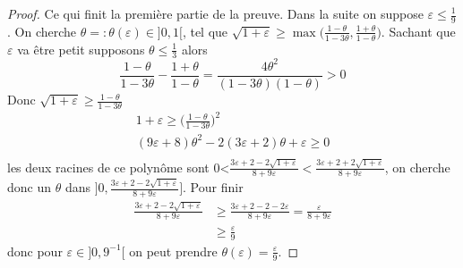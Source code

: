 \documentclass[12pt]{article}
\theoremstyle{definition}
\begin{document}
\begin{proof}
	Ce qui finit la première partie de la preuve. Dans la suite on suppose $\varepsilon\leq \frac{1}{9}$. On cherche $\theta=:\theta(\varepsilon)\in]0,1[$, tel que $\sqrt{1+\varepsilon}\geq \max\big(\frac{1-\theta}{1-3\theta},\frac{1+\theta}{1-\theta}\big)$. Sachant que $\varepsilon$ va être petit supposons $\theta\leq \frac{1}{3}$ alors
	\begin{equation*}
	\frac{1-\theta}{1-3\theta}-\frac{1+\theta}{1-\theta} = \frac{4\theta^2}{(1-3\theta) (1-\theta)}>0
	\end{equation*}
	Donc $\sqrt{1+\varepsilon}\geq \frac{1-\theta}{1-3\theta}$
	\begin{equation*}
	\begin{array}{ccc}
	1+\varepsilon \geq  \big(\frac{1-\theta}{1-3\theta}\big)^2\\
	(9\varepsilon+8)\theta^2 - 2(3\varepsilon+2)\theta +\varepsilon \geq 0\\
	\end{array}
	\end{equation*}
	les deux racines de ce polynôme sont 0<$\frac{3\varepsilon+2-2\sqrt{1+\varepsilon}}{8+9\varepsilon}<\frac{3\varepsilon+2+2\sqrt{1+\varepsilon}}{8+9\varepsilon}$, on cherche donc un $\theta$ dans $]0,\frac{3\varepsilon+2-2\sqrt{1+\varepsilon}}{8+9\varepsilon}]$. Pour finir 
	\begin{align*}
	\frac{3\varepsilon+2-2\sqrt{1+\varepsilon}}{8+9\varepsilon}&\geq \frac{3\varepsilon+2-2-2\varepsilon}{8+9\varepsilon}=\frac{\varepsilon}{8+9\varepsilon}\\
	&\geq \frac{\varepsilon}{9}
	\end{align*}
	donc pour $\varepsilon\in]0,9^{-1}[$ on peut prendre $\theta(\varepsilon)=\frac{\varepsilon}{9}$.
\end{proof}
\end{document}
